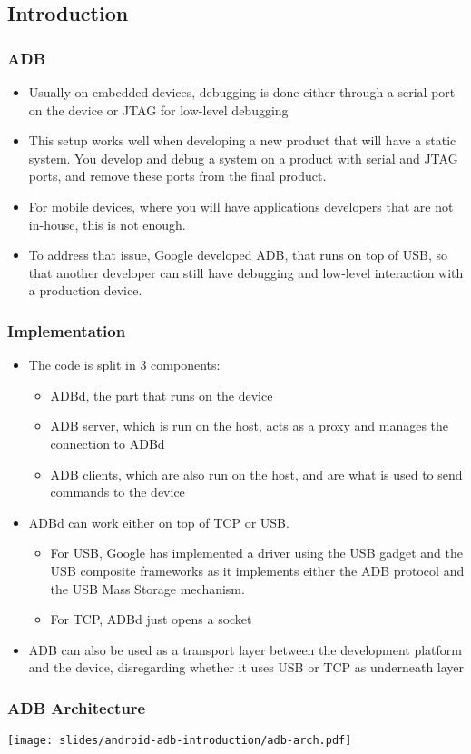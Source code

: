 \subsection{Introduction}
\begin{frame}
  \frametitle{ADB}
  \begin{itemize}
  \item Usually on embedded devices, debugging is done either
    through a serial port on the device or JTAG for low-level
    debugging
  \item This setup works well when developing a new product that will
    have a static system. You develop and debug a system on a product
    with serial and JTAG ports, and remove these ports from the final
    product.
  \item For mobile devices, where you will have applications
    developers that are not in-house, this is not enough.
  \item To address that issue, Google developed ADB, that runs on top
    of USB, so that another developer can still have debugging and
    low-level interaction with a production device.
  \end{itemize}
\end{frame}

\begin{frame}
  \frametitle{Implementation}
  \begin{itemize}
  \item The code is split in 3 components:
    \begin{itemize}
    \item ADBd, the part that runs on the device
    \item ADB server, which is run on the host, acts as a proxy and
      manages the connection to ADBd
    \item ADB clients, which are also run on the host, and are
      what is used to send commands to the device
    \end{itemize}
  \item ADBd can work either on top of TCP or USB.
    \begin{itemize}
    \item For USB, Google has implemented a driver using the USB
      gadget and the USB composite frameworks as it implements either
      the ADB protocol and the USB Mass Storage mechanism.
    \item For TCP, ADBd just opens a socket
    \end{itemize}
  \item ADB can also be used as a transport layer between the
    development platform and the device, disregarding whether it uses
    USB or TCP as underneath layer
  \end{itemize}
\end{frame}

\begin{frame}
  \frametitle{ADB Architecture}
  \begin{center}
    \texttt{[image: slides/android-adb-introduction/adb-arch.pdf]}
  \end{center}
\end{frame}
